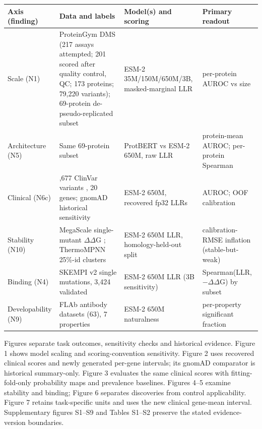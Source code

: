 \documentclass[12pt]{article}
\begin{document}
\begin{table}[!htbp]
\centering

\label{tab1}
\small\singlespacing
\setlength{\tabcolsep}{4pt}
\begin{tabular}{>{\raggedright\arraybackslash}p{} >{\raggedright\arraybackslash}p{} >{\raggedright\arraybackslash}p{} >{\raggedright\arraybackslash}p{}}
\toprule
\textbf{Axis (finding)} & \textbf{Data and labels} & \textbf{Model(s) and scoring} & \textbf{Primary readout} \\ \midrule
Scale (N1) & ProteinGym DMS \citep{Notin2023} (217 assays attempted; 201 scored after quality control, QC; 173 proteins; 79,220 variants); 69-protein de-pseudo-replicated subset & ESM-2 35M/150M/650M/3B, masked-marginal LLR & per-protein AUROC vs size \\
Architecture (N5) & Same 69-protein subset & ProtBERT vs ESM-2 650M, raw LLR & protein-mean AUROC; per-protein Spearman \\
Clinical (N6c) & 4,677 ClinVar variants \citep{Landrum2018}, 20 genes; gnomAD historical sensitivity \citep{Karczewski2020} & ESM-2 650M, recovered fp32 LLRs & AUROC; OOF calibration \\
Stability (N10) & MegaScale single-mutant $\Delta$$\Delta$G \citep{Tsuboyama2023}; \mbox{ThermoMPNN} \citep{Dieckhaus2024} 25\%-id clusters & ESM-2 650M LLR, homology-held-out split & calibration-RMSE inflation (stable-but-weak) \\
Binding (N4) & SKEMPI v2 \citep{Jankauskaite2019} single mutations, 3,424 validated & ESM-2 650M LLR (3B sensitivity) & Spearman(LLR, $-$$\Delta$$\Delta$G) by subset \\
Developability (N9) & FLAb antibody datasets \citep{Chungyoun2024FLAb} (63), 7 properties & ESM-2 650M naturalness & per-property significant fraction \\
\bottomrule
\end{tabular}
\end{table}



Figures separate task outcomes, sensitivity checks and historical evidence. Figure 1 shows model scaling and scoring-convention sensitivity. Figure 2 uses recovered clinical scores and newly generated per-gene intervals; its gnomAD comparator is historical summary-only. Figure 3 evaluates the same clinical scores with fitting-fold-only probability maps and prevalence baselines. Figures 4--5 examine stability and binding; Figure 6 separates discoveries from control applicability. Figure 7 retains task-specific units and uses the new clinical gene-mean interval. Supplementary figures S1--S9 and Tables S1--S2 preserve the stated evidence-version boundaries.
\end{document}
